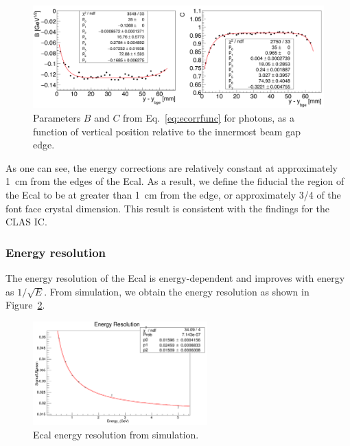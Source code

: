 \documentclass[12pt]{report}
\begin{document}
\begin{figure}[H]
  \centering
      \includegraphics[width=1.0\textwidth]{pics/performance/sfparEdge_p.png}
  \caption[Ecal energy shower parameters for photons relative to the inside beam gap edge]{Parameters $B$ and $C$ from Eq.~\ref{eq:ecorrfunc} for photons, as a function of vertical position
relative to the innermost beam gap edge.}
  \label{Figure:sfparEdgeP}
\end{figure}

As one can see, the energy corrections are relatively constant at approximately 1~cm from the edges of the Ecal. As a result, we define the fiducial the region of the Ecal to be at greater than 1~cm from the edge, or approximately 3/4 of the font face crystal dimension. This result is consistent with the findings for the CLAS IC. 

\subsubsection{Energy resolution}

The energy resolution of the Ecal is energy-dependent and improves with energy as $1/\sqrt{E}$. From simulation, we obtain the energy resolution as shown in Figure~\ref{Figure:eResFitMC}.

\begin{figure}[H]
  \centering
      \includegraphics[width=0.6\textwidth]{pics/performance/eResFitMC.png}
  \caption[Ecal energy resolution fitted from simulation]{Ecal energy resolution from simulation.}
  \label{Figure:eResFitMC}
\end{figure}
\end{document}
